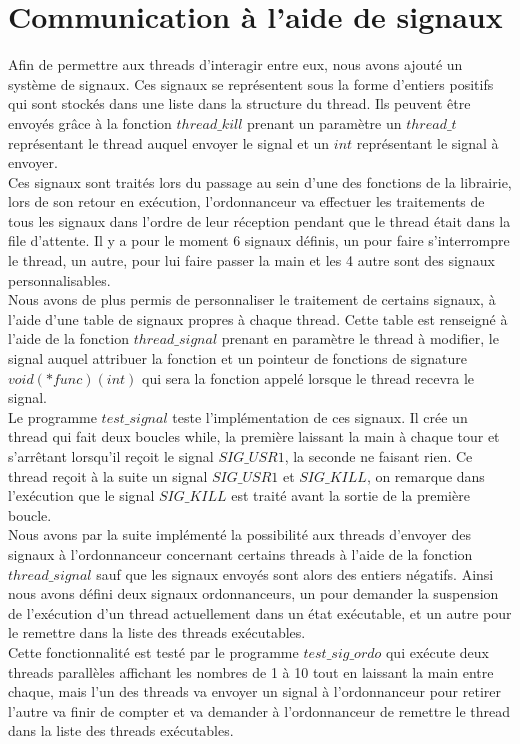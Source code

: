 \section{Communication à l'aide de signaux}
	Afin de permettre aux threads d'interagir entre eux, nous avons ajouté un système de signaux.
	Ces signaux se représentent sous la forme d'entiers positifs qui sont stockés dans une liste dans la structure du thread. Ils peuvent être envoyés grâce à la fonction $thread\_kill$ prenant un paramètre un $thread\_t$ représentant le thread auquel envoyer le signal et un $int$ représentant le signal à envoyer.\\
	
	Ces signaux sont traités lors du passage au sein d'une des fonctions de la librairie, lors de son retour en exécution, l'ordonnanceur va effectuer les traitements de tous les signaux dans l'ordre de leur réception pendant que le thread était dans la file d'attente. Il y a pour le moment 6 signaux définis, un pour faire s'interrompre le thread, un autre, pour lui faire passer la main et les 4 autre sont des signaux personnalisables.\\
	
	Nous avons de plus permis de personnaliser le traitement de certains signaux, à l'aide d'une table de signaux propres à chaque thread. Cette table est renseigné à l'aide de la fonction $thread\_signal$ prenant en paramètre le thread à modifier, le signal auquel attribuer la fonction et un pointeur de fonctions de signature $void(*func)(int)$ qui sera la fonction appelé lorsque le thread recevra le signal.\\
	
	Le programme $test\_signal$ teste l'implémentation de ces signaux. Il crée un thread qui fait deux boucles while, la première laissant la main à chaque tour et s'arrêtant lorsqu'il reçoit le signal $SIG\_USR1$, la seconde ne faisant rien. Ce thread reçoit à la suite un signal $SIG\_USR1$ et $SIG\_KILL$, on remarque dans l'exécution que le signal $SIG\_KILL$ est traité avant la sortie de la première boucle.\\


	Nous avons par la suite implémenté la possibilité aux threads d'envoyer des signaux à l'ordonnanceur concernant certains threads à l'aide de la fonction $thread\_signal$ sauf que les signaux envoyés sont alors des entiers négatifs. Ainsi nous avons défini deux signaux ordonnanceurs, un pour demander la suspension de l'exécution d'un thread actuellement dans un état exécutable, et un autre pour le remettre dans la liste des threads exécutables.\\
	
	Cette fonctionnalité est testé par le programme $test\_sig\_ordo$ qui exécute deux threads parallèles affichant les nombres de 1 à 10 tout en laissant la main entre chaque, mais l'un des threads va envoyer un signal à l'ordonnanceur pour retirer l'autre va finir de compter et va demander à l'ordonnanceur de remettre le thread dans la liste des threads exécutables.\\
